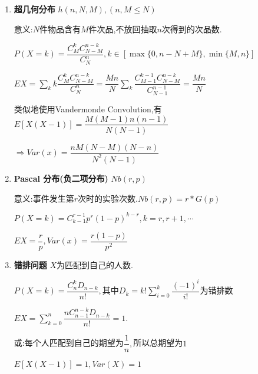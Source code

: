 \begin{enumerate}
		(即解Cauchy方程)

	\item \textbf{超几何分布} $ h(n,N,M),(n, M\le N)$

		意义:$ N$件物品含有$ M$件次品,不放回抽取$ n$次得到的次品数.

		$ P(X=k) = \dfrac{C_M^kC_{N-M}^{n-k}}{C_N^n}, k \in [\max\{0, n-N + M\}, \min\{M,n\}]$

		$ EX = \sum_{k}{k\dfrac{C_M^kC_{N-M}^{n-k}}{C_N^n}}  = \dfrac{Mn}{N}\sum_{k}{\dfrac{C_{M-1}^{k-1}C_{N-M}^{n-k}}{C_{N-1}^{n-1}}} = \dfrac{Mn}{N}$

		类似地使用Vandermonde Convolution,有$ 	E[X(X-1)] = \dfrac{M(M-1)n(n-1)}{N(N-1)}$

		$\Rightarrow Var(x)  = \dfrac{nM(N-M)(N-n)}{N^2(N-1)} $

	\item \textbf{Pascal 分布(负二项分布)} $ Nb(r,p)$

		意义:事件发生第$ r$次时的实验次数.$ Nb(r, p) = r * G(p) $

		$ P(X = k) = C_{k-1}^{r-1}p^r(1-p)^{k-r}, k = r,r+1,\cdots$

		$ EX = \dfrac{r}{p}, Var(x) = \dfrac{r(1-p)}{p^2}$

	\item \textbf{错排问题} $ X $为匹配到自己的人数.

		$ P(X = k) = \dfrac{C_n^kD_{n-k}}{n!}, 其中D_k = k!\sum_{i=0}^{k}{\dfrac{(-1)^i}{i!}}为错排数$

		$ EX = \sum_{k=0}^n{\dfrac{nC_{n-1}^{n-k}D_{n-k}}{n!}} = 1. $

		或:每个人匹配到自己的期望为$ \dfrac{1}{n},$所以总期望为$ 1$

		$ E[X(X-1)] = 1, Var(X) = 1$
\end{enumerate}
